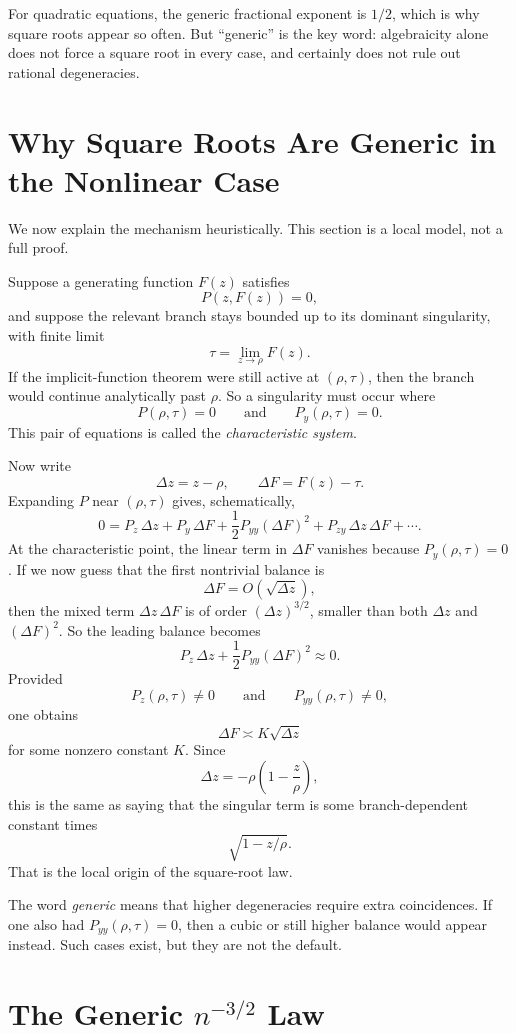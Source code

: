 For quadratic equations, the generic fractional exponent is $1/2$, which is why square roots appear so often. But ``generic'' is the key word: algebraicity alone does not force a square root in every case, and certainly does not rule out rational degeneracies.

\section{Why Square Roots Are Generic in the Nonlinear Case}

We now explain the mechanism heuristically. This section is a local model, not a full proof.

Suppose a generating function $F(z)$ satisfies
\[
  P(z,F(z)) = 0,
\]
and suppose the relevant branch stays bounded up to its dominant singularity, with finite limit
\[
  \tau = \lim_{z \to \rho} F(z).
\]
If the implicit-function theorem were still active at $(\rho,\tau)$, then the branch would continue analytically past $\rho$. So a singularity must occur where
\[
  P(\rho,\tau)=0
  \qquad\text{and}\qquad
  P_y(\rho,\tau)=0.
\]
This pair of equations is called the \emph{characteristic system}.

Now write
\[
  \Delta z = z-\rho,
  \qquad
  \Delta F = F(z)-\tau.
\]
Expanding $P$ near $(\rho,\tau)$ gives, schematically,
\[
  0 = P_z\,\Delta z + P_y\,\Delta F + \frac{1}{2}P_{yy}(\Delta F)^2 + P_{zy}\,\Delta z\,\Delta F + \cdots.
\]
At the characteristic point, the linear term in $\Delta F$ vanishes because $P_y(\rho,\tau)=0$. If we now guess that the first nontrivial balance is
\[
  \Delta F = O(\sqrt{\Delta z}),
\]
then the mixed term $\Delta z\,\Delta F$ is of order $(\Delta z)^{3/2}$, smaller than both $\Delta z$ and $(\Delta F)^2$. So the leading balance becomes
\[
  P_z\,\Delta z + \frac{1}{2}P_{yy}(\Delta F)^2 \approx 0.
\]
Provided
\[
  P_z(\rho,\tau) \ne 0
  \qquad\text{and}\qquad
  P_{yy}(\rho,\tau) \ne 0,
\]
one obtains
\[
  \Delta F \asymp K \sqrt{\Delta z}
\]
for some nonzero constant $K$. Since
\[
  \Delta z = -\rho\left(1-\frac{z}{\rho}\right),
\]
this is the same as saying that the singular term is some branch-dependent constant times
\[
  \sqrt{1-z/\rho}.
\]
That is the local origin of the square-root law.

The word \emph{generic} means that higher degeneracies require extra coincidences. If one also had $P_{yy}(\rho,\tau)=0$, then a cubic or still higher balance would appear instead. Such cases exist, but they are not the default.

\section{The Generic $n^{-3/2}$ Law}

